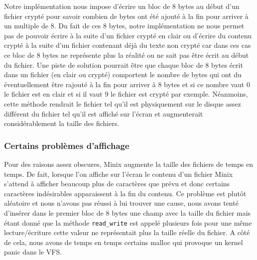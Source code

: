 \documentclass[10pt, onecolumn] {IEEEtran}
\begin{document}
Notre implémentation nous impose d'écrire un bloc de 8 bytes au début d'un fichier crypté pour savoir combien de bytes ont été ajouté à la fin pour arriver à un multiple de 8. Du fait de ces 8 bytes, notre implémentation ne nous permet pas de pouvoir écrire à la suite d'un fichier crypté en clair ou d'écrire du contenu crypté à la suite d'un fichier contenant déjà du texte non crypté car dans ces cas ce bloc de 8 bytes ne représente plus la réalité ou ne sait pas être écrit au début du fichier.
Une piste de solution pourrait être que chaque bloc de 8 bytes écrit dans un fichier (en clair ou crypté) comportent le nombre de bytes qui ont du éventuellement être rajouté à la fin pour arriver à 8 bytes et si ce nombre vaut 0 le fichier est en clair et si il vaut 9 le fichier est crypté par exemple. Néanmoins, cette méthode rendrait le fichier tel qu'il est physiquement sur le disque assez différent du fichier tel qu'il est affiché sur l'écran et augmenterait considérablement la taille des fichiers.
\subsubsection{Certains problèmes d'affichage}

Pour des raisons assez obscures, Minix augmente la taille des fichiers de temps en temps. De fait, lorsque l'on affiche sur l'écran le contenu d'un fichier Minix s'attend à afficher beaucoup plus de caractères que prévu et donc certains caractères indésirables apparaissent à la fin du contenu. Ce problème est plutôt aléatoire et nous n'avons pas réussi à lui trouver une cause, nous avons tenté d'insérer dans le premier bloc de 8 bytes une champ avec la taille du fichier mais étant donné que la méthode \texttt{read\_write} est appelé plusieurs fois pour une même lecture/écriture cette valeur ne représentait plus la taille réelle du fichier.
A côté de cela, nous avons de temps en temps certains malloc qui provoque un kernel panic dans le VFS.
\end{document}

